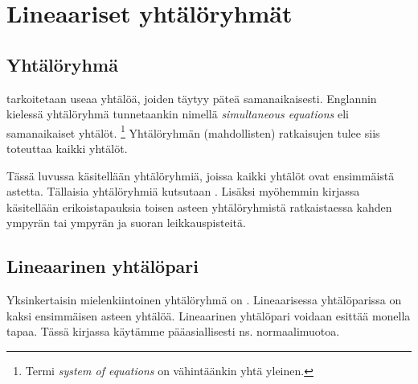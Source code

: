 \section{Lineaariset yhtälöryhmät} %


\subsection*{Yhtälöryhmä}

 tarkoitetaan useaa yhtälöä, joiden täytyy
päteä samanaikaisesti. Englannin kielessä yhtälöryhmä tunnetaankin nimellä
\textit{simultaneous equations} eli samanaikaiset yhtälöt.
\footnote{Termi \textit{system of equations} on vähintäänkin yhtä yleinen.}
Yhtälöryhmän (mahdollisten) ratkaisujen tulee siis toteuttaa kaikki yhtälöt.

Tässä luvussa käsitellään yhtälöryhmiä, joissa kaikki yhtälöt ovat ensimmäistä
astetta. Tällaisia yhtälöryhmiä kutsutaan .
Lisäksi myöhemmin kirjassa käsitellään erikoistapauksia toisen asteen yhtälöryhmistä
ratkaistaessa kahden ympyrän tai ympyrän ja suoran leikkauspisteitä.

\subsection*{Lineaarinen yhtälöpari}

Yksinkertaisin mielenkiintoinen yhtälöryhmä on
.
Lineaarisessa yhtälöparissa on kaksi ensimmäisen asteen yhtälöä.
Lineaarinen yhtälöpari voidaan esittää monella tapaa. Tässä
kirjassa käytämme pääasiallisesti ns. normaalimuotoa.


